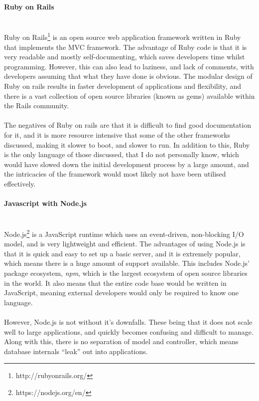 \paragraph{Ruby on Rails}\ \\
Ruby on Rails\footnote{http://rubyonrails.org/} is an open source web application framework written in Ruby that implements the MVC framework. The advantage of Ruby code is that it is very readable and mostly self-documenting, which saves developers time whilst programming. However, this can also lead to laziness, and lack of comments, with developers assuming that what they have done is obvious. The modular design of Ruby on rails results in faster development of applications and flexibility, and there is a vast collection of open source libraries (known as gems) available within the Rails community.\ \\
\ \\
The negatives of Ruby on rails are that it is difficult to find good documentation for it, and it is more resource intensive that some of the other frameworks discussed, making it slower to boot, and slower to run. In addition to this, Ruby is the only language of those discussed, that I do not personally know, which would have slowed down the initial development process by a large amount, and the intricacies of the framework would most likely not have been utilised effectively.

\paragraph{Javascript with Node.js}\ \\
Node.js\footnote{https://nodejs.org/en/} is a JavaScript runtime which uses an event-driven, non-blocking I/O model, and is very lightweight and efficient. The advantages of using Node.js is that it is quick and easy to set up a basic server, and it is extremely popular, which means there is a huge amount of support available. This includes Node.js' package ecosystem, \textit{npm}, which is the largest ecosystem of open source libraries in the world. It also means that the entire code base would be written in JavaScript, meaning external developers would only be required to know one language. \ \\
\ \\
However, Node.js is not without it's downfalls. These being that it does not scale well to large applications, and quickly becomes confusing and difficult to manage. Along with this, there is no separation of model and controller, which means database internals ``leak'' out into applications.

